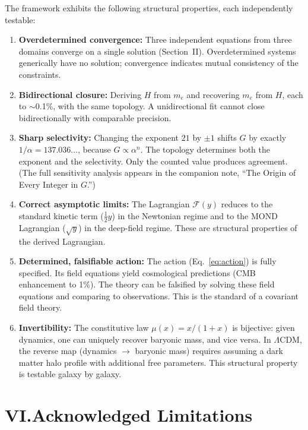 \documentclass[11pt]{article}
\begin{document}
The framework exhibits the following structural properties, each independently testable:

\begin{enumerate}[leftmargin=2em]
\item \textbf{Overdetermined convergence:} Three independent equations from three domains converge on a single solution (Section~II). Overdetermined systems generically have no solution; convergence indicates mutual consistency of the constraints.

\item \textbf{Bidirectional closure:} Deriving $H$ from $m_e$ and recovering $m_e$ from $H$, each to $\sim$0.1\%, with the same topology. A unidirectional fit cannot close bidirectionally with comparable precision.

\item \textbf{Sharp selectivity:} Changing the exponent $21$ by $\pm 1$ shifts $G$ by exactly $1/\alpha = 137.036\ldots$, because $G \propto \alpha^n$. The topology determines both the exponent and the selectivity. Only the counted value produces agreement. (The full sensitivity analysis appears in the companion note, ``The Origin of Every Integer in $G$.'')

\item \textbf{Correct asymptotic limits:} The Lagrangian $\mathcal{F}(y)$ reduces to the standard kinetic term ($\tfrac{1}{2}y$) in the Newtonian regime and to the MOND Lagrangian ($\sqrt{y}$) in the deep-field regime. These are structural properties of the derived Lagrangian.

\item \textbf{Determined, falsifiable action:} The action (Eq.~\ref{eq:action}) is fully specified. Its field equations yield cosmological predictions (CMB enhancement to 1\%). The theory can be falsified by solving these field equations and comparing to observations. This is the standard of a covariant field theory.

\item \textbf{Invertibility:} The constitutive law $\mu(x) = x/(1+x)$ is bijective: given dynamics, one can uniquely recover baryonic mass, and vice versa. In $\Lambda$CDM, the reverse map (dynamics $\to$ baryonic mass) requires assuming a dark matter halo profile with additional free parameters. This structural property is testable galaxy by galaxy.
\end{enumerate}

\section*{VI.\quad Acknowledged Limitations}
\end{document}
